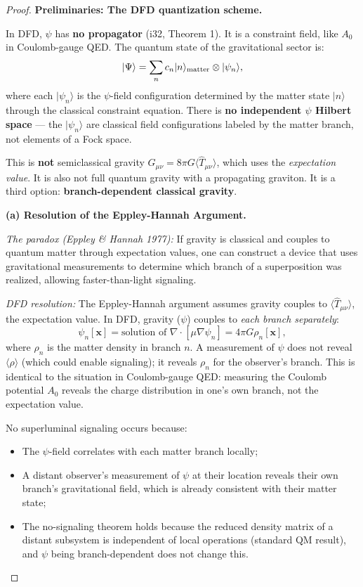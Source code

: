 \documentclass[11pt,a4paper]{article}
\begin{document}
\begin{proof}

\textbf{Preliminaries: The DFD quantization scheme.}

In DFD, $\psi$ has \textbf{no propagator} (i32, Theorem 1). It is a constraint field, like $A_0$ in Coulomb-gauge QED. The quantum state of the gravitational sector is:
\begin{equation}\label{eq:branch-state}
|\Psi\rangle = \sum_n c_n |n\rangle_{\rm matter} \otimes |\psi_n\rangle,
\end{equation}
where each $|\psi_n\rangle$ is the $\psi$-field configuration determined by the matter state $|n\rangle$ through the classical constraint equation. There is \textbf{no independent $\psi$ Hilbert space} --- the $|\psi_n\rangle$ are classical field configurations labeled by the matter branch, not elements of a Fock space.

This is \textbf{not} semiclassical gravity $G_{\mu\nu} = 8\pi G\langle\hat{T}_{\mu\nu}\rangle$, which uses the \emph{expectation value}. It is also not full quantum gravity with a propagating graviton. It is a third option: \textbf{branch-dependent classical gravity}.

\medskip

\textbf{(a) Resolution of the Eppley-Hannah Argument.}

\emph{The paradox (Eppley \& Hannah 1977):} If gravity is classical and couples to quantum matter through expectation values, one can construct a device that uses gravitational measurements to determine which branch of a superposition was realized, allowing faster-than-light signaling.

\emph{DFD resolution:} The Eppley-Hannah argument assumes gravity couples to $\langle\hat{T}_{\mu\nu}\rangle$, the expectation value. In DFD, gravity ($\psi$) couples to \emph{each branch separately}:
\begin{equation}
\psi_n[\mathbf{x}] = \text{solution of } \nabla\cdot[\mu\nabla\psi_n] = 4\pi G\rho_n[\mathbf{x}],
\end{equation}
where $\rho_n$ is the matter density in branch $n$. A measurement of $\psi$ does not reveal $\langle\rho\rangle$ (which could enable signaling); it reveals $\rho_n$ for the observer's branch. This is identical to the situation in Coulomb-gauge QED: measuring the Coulomb potential $A_0$ reveals the charge distribution in one's own branch, not the expectation value.

No superluminal signaling occurs because:
\begin{itemize}
\item The $\psi$-field correlates with each matter branch locally;
\item A distant observer's measurement of $\psi$ at their location reveals their own branch's gravitational field, which is already consistent with their matter state;
\item The no-signaling theorem holds because the reduced density matrix of a distant subsystem is independent of local operations (standard QM result), and $\psi$ being branch-dependent does not change this.
\end{itemize}


\end{proof}
\end{document}
